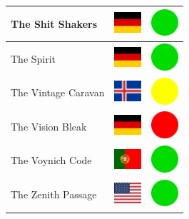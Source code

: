 \documentclass[12pt, a4paper, twoside]{report}
\begin{document}
\begin{center}
\begin{longtable}{|p{5cm}|p{2cm}|p{2cm}|}
 The Shit Shakers                                           & \includegraphics[width=1cm]{../img/flags/de} &   \includegraphics[width=1cm]{../likes/y} \\ \hline
 The Spirit                                                 & \includegraphics[width=1cm]{../img/flags/de} &   \includegraphics[width=1cm]{../likes/y} \\ \hline
 The Vintage Caravan                                        & \includegraphics[width=1cm]{../img/flags/is} &   \includegraphics[width=1cm]{../likes/m} \\ \hline
 The Vision Bleak                                           & \includegraphics[width=1cm]{../img/flags/de} &   \includegraphics[width=1cm]{../likes/n} \\ \hline
 The Voynich Code                                           & \includegraphics[width=1cm]{../img/flags/pt} &   \includegraphics[width=1cm]{../likes/y} \\ \hline
 The Zenith Passage                                         & \includegraphics[width=1cm]{../img/flags/us} &   \includegraphics[width=1cm]{../likes/y} \\ \hline

\end{longtable}
\end{center}
\end{document}

